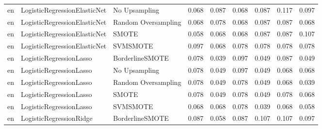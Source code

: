 \begin{tabular}{lllllllll}
      en &    LogisticRegressionElasticNet &                 No Upsampling &     0.068 &                     0.087 &                 0.068 &                  0.087 &                                   0.117 &     0.097 \\
      en &    LogisticRegressionElasticNet &           Random Oversampling &     0.068 &                     0.078 &                 0.068 &                  0.087 &                                   0.087 &     0.068 \\
      en &    LogisticRegressionElasticNet &                         SMOTE &     0.058 &                     0.068 &                 0.068 &                  0.087 &                                   0.087 &     0.107 \\
      en &    LogisticRegressionElasticNet &                      SVMSMOTE &     0.097 &                     0.068 &                 0.078 &                  0.078 &                                   0.078 &     0.078 \\
      en &         LogisticRegressionLasso &               BorderlineSMOTE &     0.078 &                     0.039 &                 0.097 &                  0.049 &                                   0.087 &     0.049 \\
      en &         LogisticRegressionLasso &                 No Upsampling &     0.078 &                     0.049 &                 0.097 &                  0.049 &                                   0.068 &     0.068 \\
      en &         LogisticRegressionLasso &           Random Oversampling &     0.078 &                     0.049 &                 0.078 &                  0.049 &                                   0.068 &     0.039 \\
      en &         LogisticRegressionLasso &                         SMOTE &     0.078 &                     0.049 &                 0.078 &                  0.049 &                                   0.078 &     0.068 \\
      en &         LogisticRegressionLasso &                      SVMSMOTE &     0.068 &                     0.068 &                 0.078 &                  0.039 &                                   0.068 &     0.058 \\
      en &         LogisticRegressionRidge &               BorderlineSMOTE &     0.087 &                     0.058 &                 0.087 &                  0.107 &                                   0.107 &     0.097 \\

\end{tabular}
